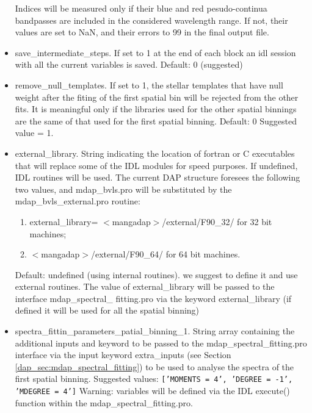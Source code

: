 \begin{itemize}
   Indices will be measured only if their blue and red pesudo-continua
   bandpasses are included in the considered wavelength range. If not,
   their values are set to NaN, and their errors to 99 in the final
   output file.

  \item save\_intermediate\_steps. If set to 1 at the end of each
    block an idl session with all the current variables is
    saved. Default: 0 (suggested)

  \item remove\_null\_templates. If set to 1, the stellar templates
    that have null weight after the fiting of the first spatial bin
    will be rejected from the other fits. It is meaningful only if the
    libraries used for the other spatial binnings are the same of that
    used for the first spatial binning. Default: 0 Suggested value =
    1.

  \item external\_library. String indicating the location of fortran
    or C executables that will replace some of the IDL modules for
    speed purposes. If undefined, IDL routines will be used. The
    current DAP structure foresees the following two values, and
    mdap\_bvls.pro will be substituted by the mdap\_bvls\_external.pro
    routine:

    \begin{enumerate}

      \item external\_library= $<$mangadap$>$/external/F90\_32/ for 32
        bit machines;
 
      \item $<$mangadap$>$/external/F90\_64/ for 64 bit machines.

    \end{enumerate}

   Default: undefined (using internal routines). we suggest to define
   it and use external routines. The value of external\_library will
   be passed to the interface mdap\_spectral\_ fitting.pro via the
   keyword external\_library (if defined it will be used for all the
   spatial binning)

  \item spectra\_fittin\_parameters\_patial\_binning\_1. String array
    containing the additional inputs and keyword to be passed to the
    mdap\_spectral\_fitting.pro interface via the input keyword
    extra\_inputs (see Section \ref{dap_sec:mdap_spectral_fitting}) to
    be used to analyse the spectra of the first spatial binning.
    Suggested values: {\tt ['MOMENTS = 4', 'DEGREE = -1', 'MDEGREE =
        4']} Warning: variables will be defined via the IDL execute()
    function within the mdap\_spectral\_fitting.pro.


\end{itemize}
